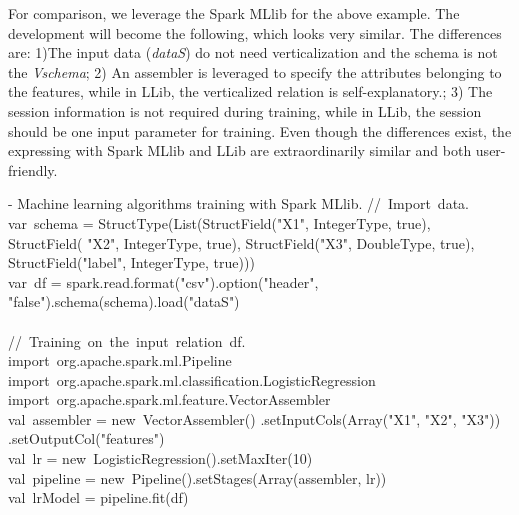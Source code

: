 For comparison, we leverage the Spark MLlib for the above example. The development will become the following, which looks very similar. The differences are: 1)The  input data (\textit{dataS}) do not need verticalization and the schema is not the \textit{Vschema}; 2) An assembler is leveraged to specify the attributes belonging to the features, while in LLib, the verticalized relation is self-explanatory.; 3) The session information is not required during training, while in LLib, the session should be one input parameter for training.
Even though the differences exist, the expressing with Spark MLlib and LLib are extraordinarily similar and both user-friendly.

\vspace{0.5em}
 - Machine learning algorithms training with Spark MLlib.
\bldl
//\ Import\ data. \\
var\ schema = StructType(List(StructField("X1", IntegerType, true), \\StructField(
"X2", IntegerType, true),
StructField("X3", DoubleType, true),\\ StructField("label", IntegerType, true))) \\

var\ df = spark.read.format("csv").option("header", "false").schema(schema).load("dataS") \\
\\
//\ Training\ on\ the\ input\ relation\ df. \\
import\ org.apache.spark.ml.Pipeline \\
import\ org.apache.spark.ml.classification.LogisticRegression \\
import\ org.apache.spark.ml.feature.VectorAssembler
\\
val\ assembler = new\ VectorAssembler()
.setInputCols(Array("X1", "X2", "X3"))\\
.setOutputCol("features") \\
val\ lr = new\  LogisticRegression().setMaxIter(10) \\
val\ pipeline = new\ Pipeline().setStages(Array(assembler, lr)) \\
val\ lrModel = pipeline.fit(df) \\
\\

